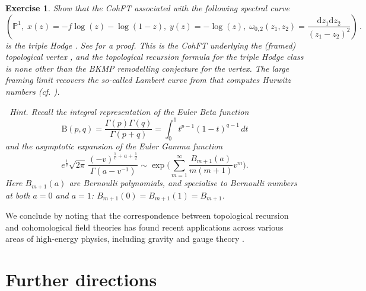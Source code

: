 \documentclass[11pt,reqno]{amsart}
\numberwithin{equation}{section}
\newcommand{\dd}{\mathrm{d}}
\newcommand{\mb}[1]{\mathbb{#1}}
\renewcommand{\P}{\mb{P}}
\theoremstyle{plain}
\newtheorem{exercise}{Exercise}[section]
\theoremstyle{definition}
\begin{document}
\begin{exercise}\label{ex:CY3}
  Show that the CohFT associated with the following spectral curve
  \begin{equation}
    \left(
      \P^1, \;
      x(z) = -f \log(z) - \log(1-z),\;
      y(z) = -\log(z), \;
      \omega_{0,2}(z_1,z_2) = \frac{\dd z_1 \dd z_2}{(z_1 - z_2)^2}
    \right) \,.
  \end{equation}
  is the \emph{triple Hodge} . See \cite[section~7]{Eyn} for a proof. This is the CohFT underlying the (framed) topological vertex \cite{MV02,LLZ03,OP04}, and the topological recursion formula for the triple Hodge class is none other than the BKMP remodelling conjecture for the vertex. The large framing limit recovers the so-called Lambert curve from \cite{BM08} that computes Hurwitz numbers (cf. \cite[section~8.2]{Eyn}).

  \smallskip

  {\small \emph{\faLightbulb \ Hint.} Recall the integral representation of the Euler Beta function
  \begin{equation}
    \mathrm{B}(p,q) = \frac{\Gamma(p)\Gamma(q)}{\Gamma(p+q)} = \int_{0}^1 t^{p-1} (1-t)^{q-1} \, dt
  \end{equation}
  and the asymptotic expansion of the Euler Gamma function
  \begin{equation}
    e^{\frac{1}{v}} \sqrt{2\pi} \,
    \frac{ (-v)^{\frac{1}{v}+a+\frac{1}{2}} }{\Gamma(a - v^{-1})}
    \sim
    \exp\Biggl(
      \sum_{m=1}^{\infty} \frac{B_{m+1}(a)}{m(m+1)} v^{m}
    \Biggr).
  \end{equation}
  Here $B_{m+1}(a)$ are Bernoulli polynomials, and specialise to Bernoulli numbers at both $a = 0$ and $a = 1$: $B_{m+1}(0) = B_{m+1}(1) = B_{m+1}$.
  }
\end{exercise}

We conclude by noting that the correspondence between topological recursion and cohomological field theories has found recent applications across various areas of high-energy physics, including gravity \cite{Ebe24,CEMR24,CEMR25,AC25} and gauge theory \cite{GM}.

\newpage
\section{Further directions}
\label{sec:next}

\end{document}

